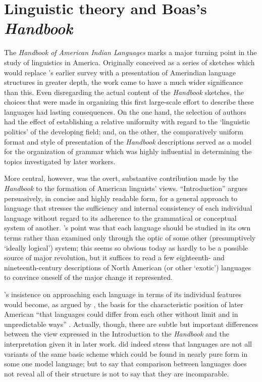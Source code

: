 \section{Linguistic theory and Boas's \textsl{Handbook}}

The \textsl{Handbook of American Indian Languages} marks a major
turning point in the study of linguistics in America. Originally
conceived as a series of sketches which would replace {\Powell}'s earlier
survey with a presentation of Amerindian language structures in
greater depth, the work came to have a much wider significance than
this. Even disregarding the actual content of the \textsl{Handbook}
sketches, the choices that were made in organizing this first
large-scale effort to describe these languages had lasting
consequences. On the one hand, the selection of authors had the effect
of establishing a relative uniformity with regard to the `linguistic
politics' of the developing field; and, on the other, the
comparatively uniform format and style of presentation of the
\textsl{Handbook} descriptions served as a model for the organization
of grammar which was highly influential in determining the topics
investigated by later workers.

More central, however, was the overt, substantive contribution made by
the \textsl{Handbook} to the formation of American linguists'
views.  ``Introduction'' argues
persuasively, in concise and highly readable form, for a general
approach to language that stresses the sufficiency and internal
consistency of each individual language without regard to its
adherence to the grammatical or conceptual system of another. {\Boas}'s
point was that each language should be studied in its own terms rather
than examined only through the optic of some other (presumptively
`ideally logical') system; this seems so obvious today as hardly to be
a possible source of major revolution, but it suffices to read a few
eighteenth- and nineteenth-century descriptions of North American (or
other `exotic') languages to convince oneself of the major {change} it
represented.

{\Boas}'s insistence on approaching each language in terms of its
individual features would become, as argued
by \citet{teeter64:triviality}, the basis for the characteristic
position of later American  ``that languages could differ
from each other without limit and in unpredictable ways''
\citep[96]{joos57:readings}. Actually, though, there are subtle but
important differences between the view expressed in the Introduction
to the \textsl{Handbook} and the interpretation given it in later
work. {\Boas} did indeed {stress} that languages are not all variants of
the same basic scheme which could be found in nearly pure form in some
one model language; but to say that comparison between languages does
not reveal all of their structure is not to say that they are
incomparable.

